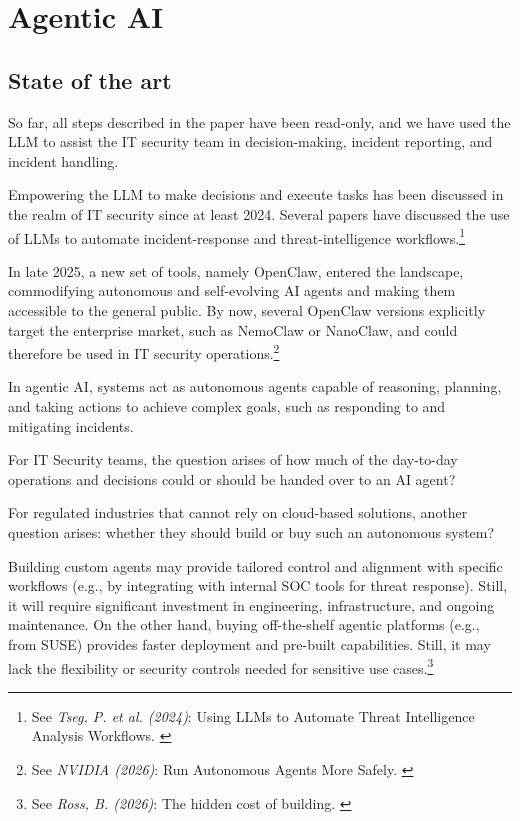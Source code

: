 %
%

\pagebreak
\section{Agentic AI}

\onehalfspacing

\subsection{State of the art}

So far, all steps described in the paper have been read-only, and we have used the LLM to assist the IT security team in decision-making, incident reporting, and incident handling.

Empowering the LLM to make decisions and execute tasks has been discussed in the realm of IT security since at least 2024. Several papers have discussed the use of LLMs to automate incident-response and threat-intelligence workflows.\footnote{See \textit{Tseg, P. et al. (2024)}: Using LLMs to Automate Threat Intelligence Analysis Workflows. \cite{tseng2024}}

In late 2025, a new set of tools, namely OpenClaw, entered the landscape, commodifying autonomous and self-evolving AI agents and making them accessible to the general public. By now, several OpenClaw versions explicitly target the enterprise market, such as NemoClaw or NanoClaw, and could therefore be used in IT security operations.\footnote{See \textit{NVIDIA (2026)}: Run Autonomous Agents More Safely. \cite{nemoClaw}}

In agentic AI, systems act as autonomous agents capable of reasoning, planning, and taking actions to achieve complex goals, such as responding to and mitigating incidents. 

For IT Security teams, the question arises of how much of the day-to-day operations and decisions could or should be handed over to an AI agent?

For regulated industries that cannot rely on cloud-based solutions, another question arises: whether they should build or buy such an autonomous system?

Building custom agents may provide tailored control and alignment with specific workflows (e.g., by integrating with internal SOC tools for threat response). Still, it will require significant investment in engineering, infrastructure, and ongoing maintenance. On the other hand, buying off-the-shelf agentic platforms (e.g., from SUSE) provides faster deployment and pre-built capabilities. Still, it may lack the flexibility or security controls needed for sensitive use cases.\footnote{See \textit{Ross, B. (2026)}: The hidden cost of building. \cite{hiddenCost}}

